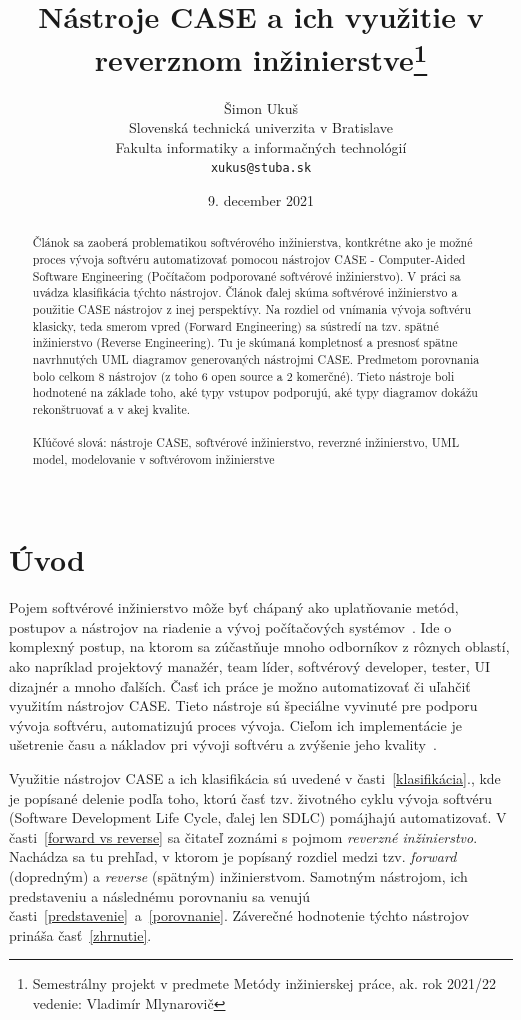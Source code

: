 \documentclass[10pt,twoside,slovak,a4paper]{article}
\title{Nástroje CASE a ich využitie v reverznom inžinierstve\thanks{Semestrálny projekt v predmete Metódy inžinierskej práce, ak. rok 2021/22 vedenie: Vladimír Mlynarovič}} %
\author{Šimon Ukuš\\[2pt]
	{\small Slovenská technická univerzita v Bratislave}\\
	{\small Fakulta informatiky a informačných technológií}\\
	{\small \texttt{xukus@stuba.sk}}
	}
\date{\small 9. december 2021}
\begin{document}
\maketitle

\begin{abstract}
Článok sa zaoberá problematikou softvérového inžinierstva, kontkrétne ako je možné proces vývoja softvéru automatizovať pomocou nástrojov CASE - Computer-Aided Software Engineering (Počítačom podporované softvérové inžinierstvo). V práci sa uvádza klasifikácia týchto nástrojov.  Článok ďalej skúma softvérové inžinierstvo a použitie CASE nástrojov z inej perspektívy.  Na rozdiel od vnímania vývoja softvéru klasicky, teda smerom vpred (Forward Engineering) sa sústredí na tzv. spätné inžinierstvo (Reverse Engineering). Tu je skúmaná kompletnosť a presnosť spätne navrhnutých UML diagramov generovaných nástrojmi CASE. Predmetom porovnania bolo celkom 8 nástrojov (z toho 6 open source a 2 komerčné). Tieto nástroje boli hodnotené na základe toho, aké typy vstupov podporujú, aké typy diagramov dokážu rekonštruovať a v akej kvalite.
 \\
 \\
 Kľúčové slová: nástroje CASE, softvérové inžinierstvo, reverzné inžinierstvo, UML model, modelovanie v softvérovom inžinierstve
 \\
 \\
\end{abstract}


\section{Úvod}
Pojem softvérové inžinierstvo môže byť chápaný ako uplatňovanie metód, postupov a nástrojov na riadenie a vývoj počítačových systémov~\cite{1985}. Ide o komplexný postup, na ktorom sa zúčastňuje mnoho odborníkov z rôznych oblastí, ako napríklad projektový manažér, team líder, softvérový developer, tester, UI dizajnér a mnoho ďalších. Časť ich práce je možno automatizovať či uľahčiť využitím nástrojov CASE. Tieto nástroje sú špeciálne vyvinuté pre podporu vývoja softvéru, automatizujú proces vývoja. Cieľom ich implementácie je ušetrenie času a nákladov pri vývoji softvéru a zvýšenie jeho kvality~\cite{Osama:Adoption}.

Využitie nástrojov CASE a ich klasifikácia sú uvedené v časti~\ref{klasifikácia}., kde je popísané delenie podľa toho, ktorú časť tzv. životného cyklu vývoja softvéru (Software Development Life Cycle, ďalej len SDLC) pomájhajú automatizovať. 
V časti~\ref{forward vs reverse} sa čitateľ zoznámi s pojmom \emph{reverzné inžinierstvo}. Nachádza sa tu prehľad, v ktorom je popísaný rozdiel medzi tzv. \emph{forward} (dopredným) a \emph{reverse} (spätným) inžinierstvom. 
Samotným nástrojom, ich predstaveniu a následnému porovnaniu sa venujú časti~\ref{predstavenie}~a~\ref{porovnanie}.
Záverečné hodnotenie týchto nástrojov prináša časť~\ref{zhrnutie}.
\end{document}
